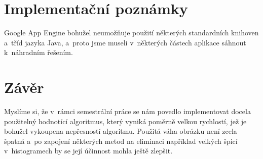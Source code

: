 \documentclass[12pt,oneside,a4paper]{article}
\begin{document}
\section{Implementační poznámky}

Google App Engine bohužel neumožňuje použití některých standardních knihoven a~tříd jazyka Java, a~proto jsme museli v~některých částech aplikace sáhnout k~náhradním řešením.


\section{Závěr}

Myslíme si, že v~rámci semestrální práce se nám povedlo implementovat docela použitelný hodnotící algoritmus, který vyniká poměrně velkou rychlostí, jež je bohužel vykoupena nepřesností algoritmu. Použitá váha obrázku není zcela špatná a~po zapojení některých metod na eliminaci například velkých špicí v~histogramech by se její účinnost mohla ještě zlepšit.


\fi

\renewcommand{\refname}{Literatura}

{
 
}
\end{document}
